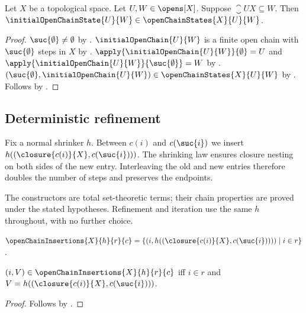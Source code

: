 \begin{proposition}\label{initial_open_chain_state_in}
    Let $X$ be a topological space.
    Let $U,W\in\opens[X]$.
    Suppose $\closure{U}{X}\subseteq W$.
    Then $\initialOpenChainState{U}{W}
        \in\openChainStates{X}{U}{W}$.
\end{proposition}
\begin{proof}
    $\suc{\emptyset}\neq\emptyset$ by .
    $\initialOpenChain{U}{W}$ is a finite open chain with
        $\suc{\emptyset}$ steps in $X$
        by .
    $\apply{\initialOpenChain{U}{W}}{\emptyset}=U$ and
        $\apply{\initialOpenChain{U}{W}}{\suc{\emptyset}}=W$
        by .
    $(\suc{\emptyset},\initialOpenChain{U}{W})
        \in\openChainStates{X}{U}{W}$
        by .
    Follows by .
\end{proof}

\subsection{Deterministic refinement}

Fix a normal shrinker $h$. Between $c(i)$ and $c(\suc{i})$ we insert
$h((\closure{c(i)}{X},c(\suc{i})))$. The shrinking law ensures closure
nesting on both sides of the new entry. Interleaving the old and new entries
therefore doubles the number of steps and preserves the endpoints.

The constructors are total set-theoretic terms; their chain properties are
proved under the stated hypotheses. Refinement and iteration use the same
$h$ throughout, with no further choice.

\begin{definition}\label{open_chain_insertions}
    $\openChainInsertions{X}{h}{r}{c}=
        \{(i,h((\closure{c(i)}{X},c(\suc{i}))))\mid i\in r\}$.
\end{definition}

\begin{proposition}\label{open_chain_insertions_membership}
    $(i,V)\in\openChainInsertions{X}{h}{r}{c}$ iff
        $i\in r$ and
        $V=h((\closure{c(i)}{X},c(\suc{i})))$.
\end{proposition}
\begin{proof}
    Follows by .
\end{proof}


